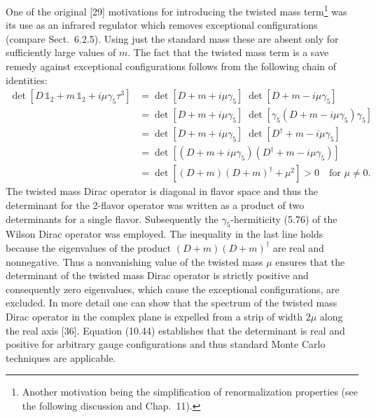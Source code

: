 One of the original [29] motivations for introducing the twisted mass
term\footnote{Another motivation being the simplification of renormalization
properties (see the following discussion and Chap.~11).} was its use as an
infrared regulator which removes exceptional configurations (compare
Sect.~6.2.5). Using just the standard mass these are absent only for
sufficiently large values of $m$. The fact that the twisted mass term is a
save remedy against exceptional configurations follows from the following
chain of identities:
\begin{equation}
  \begin{split}
    \det\left[D\,\mathbb{1}_2 + m\,\mathbb{1}_2 + i\mu\gamma_5\tau^3\right]
    &= \det[D + m + i\mu\gamma_5]\; \det[D + m - i\mu\gamma_5] \\
    &= \det[D + m + i\mu\gamma_5]\;
       \det\left[\gamma_5 (D + m - i\mu\gamma_5)\gamma_5\right] \\
    &= \det[D + m + i\mu\gamma_5]\;
       \det[D^{\dagger} + m - i\mu\gamma_5] \\
    &= \det\left[(D + m + i\mu\gamma_5)(D^{\dagger} + m - i\mu\gamma_5)\right] \\
    &= \det\left[(D + m)(D + m)^{\dagger} + \mu^2\right] > 0
       \quad \text{for } \mu \neq 0 .
  \end{split}
\end{equation}
The twisted mass Dirac operator is diagonal in flavor space and thus the
determinant for the 2-flavor operator was written as a product of two
determinants for a single flavor. Subsequently the $\gamma_5$-hermiticity
(5.76) of the Wilson Dirac operator was employed. The inequality in the last
line holds because the eigenvalues of the product $(D + m)(D + m)^{\dagger}$
are real and nonnegative. Thus a nonvanishing value of the twisted mass $\mu$
ensures that the determinant of the twisted mass Dirac operator is strictly
positive and consequently zero eigenvalues, which cause the exceptional
configurations, are excluded. In more detail one can show that the spectrum of
the twisted mass Dirac operator in the complex plane is expelled from a strip
of width $2\mu$ along the real axis [36]. Equation (10.44) establishes that
the determinant is real and positive for arbitrary gauge configurations and
thus standard Monte Carlo techniques are applicable.

